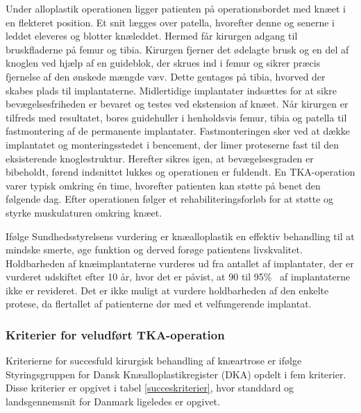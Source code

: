 Under alloplastik operationen ligger patienten  på operationsbordet med knæet i en flekteret position. Et snit lægges over patella, hvorefter denne og senerne i leddet eleveres og blotter knæleddet. Hermed får kirurgen adgang til bruskfladerne på femur og tibia. Kirurgen fjerner  det ødelagte brusk og en del af knoglen ved hjælp af en guideblok, der skrues ind i femur og sikrer præcis fjernelse af den ønskede mængde væv. Dette gentages på tibia, hvorved der skabes plads til implantaterne. Midlertidige implantater indsættes for at sikre bevægelsesfriheden er bevaret og testes ved ekstension af knæet. Når kirurgen er tilfreds med resultatet, bores guidehuller i henholdsvis femur, tibia og patella til fastmontering af de permanente implantater. Fastmonteringen sker ved at dække implantatet og monteringsstedet i bencement, der limer proteserne fast til den eksisterende knoglestruktur. Herefter sikres igen, at bevægelsesgraden er bibeholdt, førend indsnittet lukkes og operationen er fuldendt. En TKA-operation varer typisk omkring én time, hvorefter patienten kan støtte på benet den følgende dag. Efter operationen følger et rehabiliteringsforløb for at støtte og styrke muskulaturen omkring knæet. \citep{Sanna2013} \citep{tka-technique}

Ifølge Sundhedsstyrelsens vurdering er knæalloplastik en effektiv behandling til at mindske smerte, øge funktion og derved forøge patientens livskvalitet. Holdbarheden af knæimplantaterne vurderes ud fra antallet af implantater, der er vurderet udskiftet efter 10 år, hvor det er påvist, at 90 til 95\%~ af implantaterne ikke er revideret. Det er ikke muligt at vurdere holdbarheden af den enkelte protese, da flertallet af patienterne dør med et velfungerende implantat. \citep{brostrom2012}

\subsubsection{Kriterier for veludført TKA-operation}\label{tek_succes}
Kriterierne for succesfuld kirurgisk behandling af knæartrose er ifølge Styringsgruppen for Dansk Knæalloplastikregister (DKA) opdelt i fem kriterier. \citep{aarsrapport2016} Disse kriterier er opgivet i tabel \ref{succeskriterier}, hvor standdard og landsgennemsnit for Danmark ligeledes er opgivet. 


